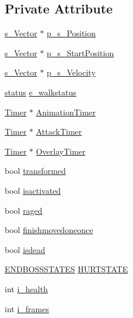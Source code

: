 \subsection*{Private Attribute}
\begin{DoxyCompactItemize}
\item 
\hyperlink{structs___vector}{s\-\_\-\-Vector} $\ast$ \hyperlink{class_final_boss_a3358e45bfff33ea01c3be43f9793ffc6}{p\-\_\-s\-\_\-\-Position}
\item 
\hyperlink{structs___vector}{s\-\_\-\-Vector} $\ast$ \hyperlink{class_final_boss_aaf6995cae7ba5231e13b7ff9aa9f4d33}{p\-\_\-s\-\_\-\-Start\-Position}
\item 
\hyperlink{structs___vector}{s\-\_\-\-Vector} $\ast$ \hyperlink{class_final_boss_a0f297f611b1ffb5ac07c9bc60361900a}{p\-\_\-s\-\_\-\-Velocity}
\item 
\hyperlink{globals_8h_a015eb90e0de9f16e87bd149d4b9ce959}{status} \hyperlink{class_final_boss_a6fc89543b9381f89286223d77c89bc5d}{e\-\_\-walkstatus}
\item 
\hyperlink{class_timer}{Timer} $\ast$ \hyperlink{class_final_boss_a0a5394a3c3202914a2aaf3f80cc89b77}{Animation\-Timer}
\item 
\hyperlink{class_timer}{Timer} $\ast$ \hyperlink{class_final_boss_a51782ed6b05ffd27a37dbbb4255da480}{Attack\-Timer}
\item 
\hyperlink{class_timer}{Timer} $\ast$ \hyperlink{class_final_boss_a5608dc60df229b811de1db353ca2c69e}{Overlay\-Timer}
\item 
bool \hyperlink{class_final_boss_af35eab748c9638f361848b2ab2e05f4e}{transformed}
\item 
bool \hyperlink{class_final_boss_a8fac01359d5104f2707577e1872d7cf8}{isactivated}
\item 
bool \hyperlink{class_final_boss_ae03958c8fd33c1e01be3391e4dd7dc1b}{raged}
\item 
bool \hyperlink{class_final_boss_a8a20a34a6d12893b7a68fced0a89fdbb}{finishmovedoneonce}
\item 
bool \hyperlink{class_final_boss_aef3b377d03f1b620702d5240763f1bab}{isdead}
\item 
\hyperlink{globals_8h_a5475104070b0bfa8f8b8780dd51fe83e}{E\-N\-D\-B\-O\-S\-S\-S\-T\-A\-T\-E\-S} \hyperlink{class_final_boss_ac54aa7f4deaf40f519e02f0a565973d2}{H\-U\-R\-T\-S\-T\-A\-T\-E}
\item 
int \hyperlink{class_final_boss_a8769aa90c675cce6af3711d7875ca733}{i\-\_\-health}
\item 
int \hyperlink{class_final_boss_a0a4f0f0ba89c151c79609e520888319e}{i\-\_\-frames}
\end{DoxyCompactItemize}


